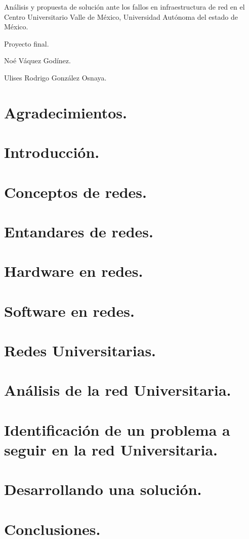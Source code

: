\documentclass[12pt, letterpaper]{article}
\begin{document}
\newpage

Análisis y propuesta de solución ante los fallos en infraestructura de red 
en el Centro Universitario Valle de México, Universidad Autónoma del estado de México.\newline 
\begin{center}
Proyecto final.
\end{center}

\begin{flushright}
Noé Váquez Godínez.
\end{flushright}
\begin{flushright}
Ulises Rodrigo González Osnaya.
\end{flushright}
\newpage
\tableofcontents
\newpage
\section{Agradecimientos.}
\newpage
\section{Introducción.}
\newpage
\section{Conceptos de redes.}
\newpage
\section{Entandares de redes.}
\newpage
\section{Hardware en redes.}
\newpage
\section{Software en redes.}
\newpage
\section{Redes Universitarias.}
\newpage
\section{Análisis de la red Universitaria.}
\newpage
\section{Identificación de un problema a seguir en la red Universitaria.}
\newpage
\section{Desarrollando una solución.}
\newpage
\section{Conclusiones.}
\newpage


\end{document}
